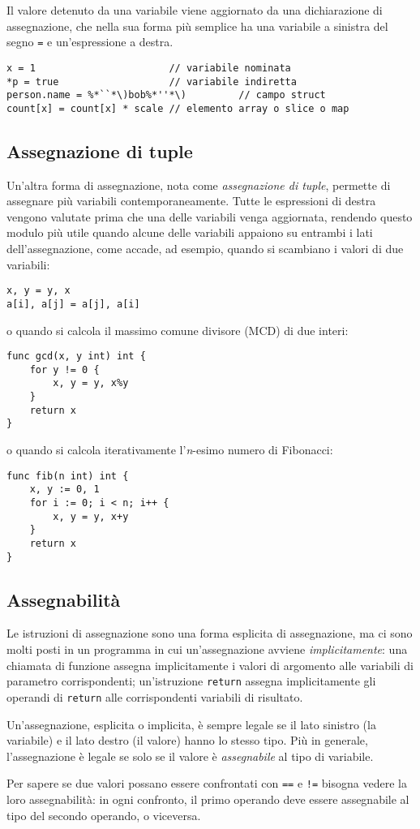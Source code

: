 %
Il valore detenuto da una variabile viene aggiornato da una dichiarazione di assegnazione, che nella sua forma più semplice ha una variabile a sinistra del segno \verb|=| e un'espressione a destra.
\begin{lstlisting}[frame=single, label={lst:lstlisting1-4.1}]
x = 1                       // variabile nominata
*p = true                   // variabile indiretta
person.name = %*``*\)bob%*''*\)         // campo struct
count[x] = count[x] * scale // elemento array o slice o map
\end{lstlisting}

\subsection{Assegnazione di tuple}
\label{subsec:assegnazione_di_tuple}%
Un'altra forma di assegnazione, nota come \textit{assegnazione di tuple}, permette di assegnare più variabili contemporaneamente.
Tutte le espressioni di destra vengono valutate prima che una delle variabili venga aggiornata, rendendo questo modulo più utile quando alcune delle variabili appaiono su entrambi i lati dell'assegnazione, come accade, ad esempio, quando si scambiano i valori di due variabili:
\begin{lstlisting}[frame=single, label={lst:lstlisting1-4-1.1}]
x, y = y, x
a[i], a[j] = a[j], a[i]
\end{lstlisting}
o quando si calcola il massimo comune divisore (MCD) di due interi:
\begin{lstlisting}[frame=single, label={lst:lstlisting1-4-1.2}]
func gcd(x, y int) int {
    for y != 0 {
        x, y = y, x%y
    }
    return x
}
\end{lstlisting}
o quando si calcola iterativamente l'\textit{n}-esimo numero di Fibonacci:
\begin{lstlisting}[frame=single, label={lst:lstlisting1-4-1.3}]
func fib(n int) int {
    x, y := 0, 1
    for i := 0; i < n; i++ {
        x, y = y, x+y
    }
    return x
}
\end{lstlisting}

\subsection{Assegnabilità}
\label{subsec:assegnabilita}%
Le istruzioni di assegnazione sono una forma esplicita di assegnazione, ma ci sono molti posti in un programma in cui un'assegnazione avviene \textit{implicitamente}: una chiamata di funzione assegna implicitamente i valori di argomento alle variabili di parametro corrispondenti;
un'istruzione \verb|return| assegna implicitamente gli operandi di \verb|return| alle corrispondenti variabili di risultato.

Un'assegnazione, esplicita o implicita, è sempre legale se il lato sinistro (la variabile) e il lato destro (il valore) hanno lo stesso tipo.
Più in generale, l'assegnazione è legale se solo se il valore è \textit{assegnabile} al tipo di variabile.

Per sapere se due valori possano essere confrontati con \verb|==| e \verb|!=| bisogna vedere la loro assegnabilità: in ogni confronto, il primo operando deve essere assegnabile al tipo del secondo operando, o viceversa.

